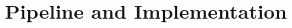 \documentclass[a4paper,10pt,DIV=14]{scrartcl}
\begin{document}
\section{Pipeline and Implementation}
\label{sec:Implementation}

\clearpage

\clearpage





\clearpage


% 

\end{document}
